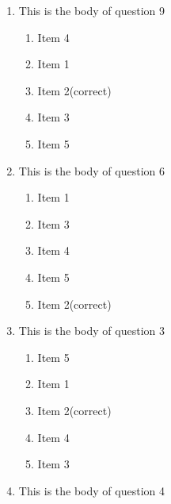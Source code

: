 \documentclass[amsfonts,bezier,leqno,fleqn,12pt,a4paper]{article}
\begin{document}
{{{{\begin{large}
\begin{enumerate}
\begin{enumerate}
\item  Item 3
\item  Item 2\hfill {\small (correct)}
\item  Item 1
\item  Item 5
\item  Item 4

\end{enumerate}
\newpage


\item This is the body of question 9
\vspace {0.3in}
\setcounter{equation}{0}

\begin{enumerate}
\item  Item 4
\item  Item 1
\item  Item 2\hfill {\small (correct)}
\item  Item 3
\item  Item 5

\end{enumerate}

\vspace {3.5cm}


\item This is the body of question 6
\vspace {0.3in}
\setcounter{equation}{0}

\begin{enumerate}
\item  Item 1
\item  Item 3
\item  Item 4
\item  Item 5
\item  Item 2\hfill {\small (correct)}

\end{enumerate}
\newpage


\item This is the body of question 3
\vspace {0.3in}
\setcounter{equation}{0}

\begin{enumerate}
\item  Item 5
\item  Item 1
\item  Item 2\hfill {\small (correct)}
\item  Item 4
\item  Item 3

\end{enumerate}

\vspace {3.5cm}


\item This is the body of question 4
\vspace {0.3in}
\setcounter{equation}{0}


\end{enumerate}
\end{large}}}}}
\end{document}
